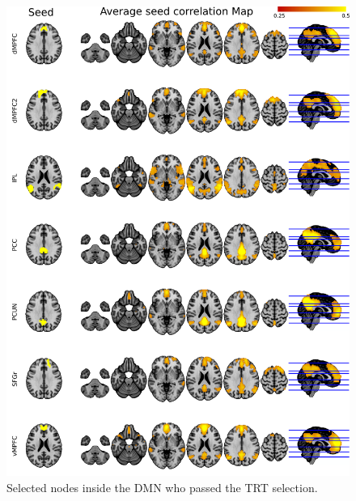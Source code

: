 \begin{figure}[H]
\begin{center}
\includegraphics[width=\linewidth]{../figures/fig_nodes_DMN.png}
\end{center}
\caption[Selected region inside DMN]{
  Selected nodes inside the DMN who passed the TRT selection.
}
\label{fig_nodes_DMN}
\end{figure}

